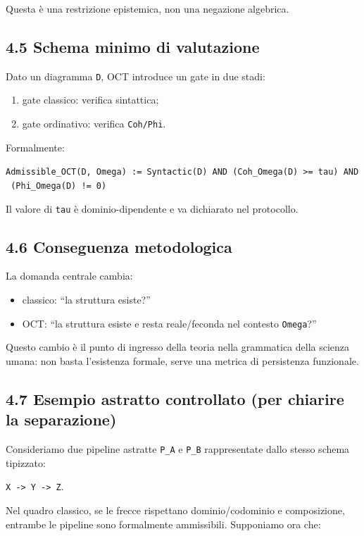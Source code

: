 Questa è una restrizione epistemica, non una negazione algebrica.

\subsection{4.5 Schema minimo di valutazione}

Dato un diagramma \texttt{D}, OCT introduce un gate in due stadi:

\begin{enumerate}
\def\labelenumi{\arabic{enumi}.}
\tightlist
\item
  gate classico: verifica sintattica;
\item
  gate ordinativo: verifica \texttt{Coh/Phi}.
\end{enumerate}

Formalmente:

\texttt{Admissible\_OCT(D,\ Omega)\ :=\ Syntactic(D)\ AND\ (Coh\_Omega(D)\ \textgreater{}=\ tau)\ AND\ (Phi\_Omega(D)\ !=\ 0)}

Il valore di \texttt{tau} è dominio-dipendente e va dichiarato nel protocollo.

\subsection{4.6 Conseguenza metodologica}

La domanda centrale cambia:

\begin{itemize}
\tightlist
\item
  classico: ``la struttura esiste?''
\item
  OCT: ``la struttura esiste e resta reale/feconda nel contesto \texttt{Omega}?''
\end{itemize}

Questo cambio è il punto di ingresso della teoria nella grammatica della scienza umana: non basta l'esistenza formale, serve una metrica di persistenza funzionale.

\subsection{4.7 Esempio astratto controllato (per chiarire la separazione)}

Consideriamo due pipeline astratte \texttt{P\_A} e \texttt{P\_B} rappresentate dallo stesso schema tipizzato:

\texttt{X\ -\textgreater{}\ Y\ -\textgreater{}\ Z}.

Nel quadro classico, se le frecce rispettano dominio/codominio e composizione, entrambe le pipeline sono formalmente ammissibili. Supponiamo ora che:

